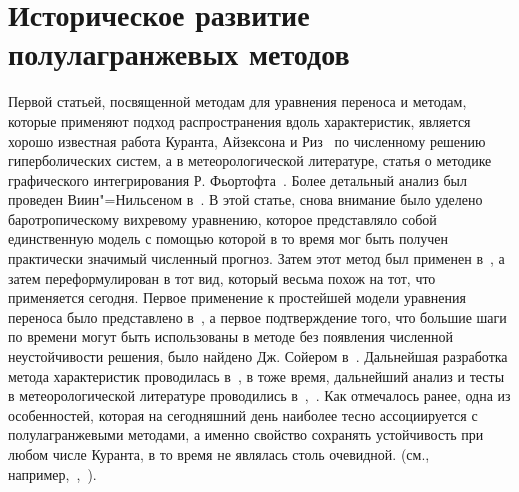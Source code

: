 \chapter{Историческое развитие полулагранжевых методов} \label{chapt_4}
Первой статьей, посвященной методам для уравнения переноса и методам, которые применяют подход распространения вдоль характеристик, является хорошо известная работа Куранта, Айзексона и Риз~\cite{A11} по численному решению гиперболических систем, а в метеорологической литературе, статья о методике графического интегрирования Р. Фьортофта~\cite{A20}. Более детальный анализ был проведен Виин"=Нильсеном в~\cite{A73}. В этой статье, снова внимание было уделено баротропическому вихревому уравнению, которое представляло собой единственную модель с помощью которой в то время мог быть получен практически значимый численный прогноз. Затем этот метод был применен в~\cite{A48}, а затем переформулирован в тот вид, который весьма похож на тот, что применяется сегодня. Первое применение к простейшей модели уравнения переноса было представлено в~\cite{A28}, а первое подтверждение того, что большие шаги по времени могут быть использованы в методе без появления численной неустойчивости решения, было найдено Дж. Сойером в~\cite{A63}. Дальнейшая разработка метода характеристик проводилась в~\cite{A1}, в тоже время, дальнейший анализ и тесты в метеорологической литературе проводились в~\cite{A30},~\cite{A12}. Как отмечалось ранее, одна из особенностей, которая на сегодняшний день наиболее тесно ассоциируется с полулагранжевыми методами, а именно свойство сохранять устойчивость при любом числе Куранта, в то время не являлась столь очевидной. (см., например,~\cite{A30},~\cite{A53}).

